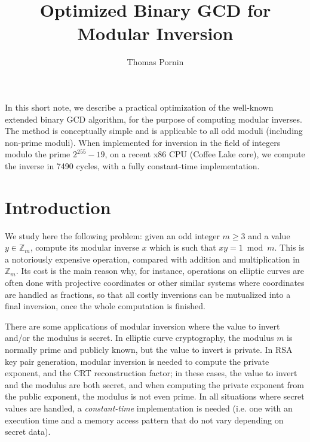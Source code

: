 \documentclass{llncs}
\makeatletter
\renewenvironment{abstract}{%
      \list{}{\advance\topsep by0.35cm\relax\small
      \leftmargin=1cm
      \labelwidth=\z@
      \listparindent=\z@
      \itemindent\listparindent
      \rightmargin\leftmargin}\item[\hskip\labelsep
                                    \textsf{\textbf{\abstractname}}]}
    {\endlist}
\newcommand{\bZ}{\mathbb{Z}}
\makeatother
\begin{document}
\title{\textsf{Optimized Binary GCD for Modular Inversion}}

\author{Thomas Pornin}

\maketitle
\noindent{} %

\begin{abstract}
In this short note, we describe a practical optimization of the
well-known extended binary GCD algorithm, for the purpose of computing
modular inverses. The method is conceptually simple and is applicable
to all odd moduli (including non-prime moduli). When implemented
for inversion in the field of integers modulo the prime $2^{255}-19$, on
a recent x86 CPU (Coffee Lake core), we compute the inverse in 7490
cycles, with a fully constant-time implementation.
\end{abstract}

\section{Introduction}\label{sec:intro}

We study here the following problem: given an odd integer $m \geq 3$ and
a value $y \in \bZ_m$, compute its modular inverse $x$ which is such
that $xy = 1 \bmod m$. This is a notoriously expensive operation,
compared with addition and multiplication in $\bZ_m$. Its cost is the
main reason why, for instance, operations on elliptic curves are often
done with projective coordinates or other similar systems where
coordinates are handled as fractions, so that all costly inversions can
be mutualized into a final inversion, once the whole computation is
finished.

There are some applications of modular inversion where the value to
invert and/or the modulus is secret. In elliptic curve cryptography, the
modulus $m$ is normally prime and publicly known, but the value to
invert is private. In RSA key pair generation, modular inversion is
needed to compute the private exponent, and the CRT reconstruction
factor; in these cases, the value to invert and the modulus are both
secret, and when computing the private exponent from the public
exponent, the modulus is not even prime. In all situations where secret
values are handled, a \emph{constant-time} implementation is needed
(i.e. one with an execution time and a memory access pattern that
do not vary depending on secret data).
\end{document}
